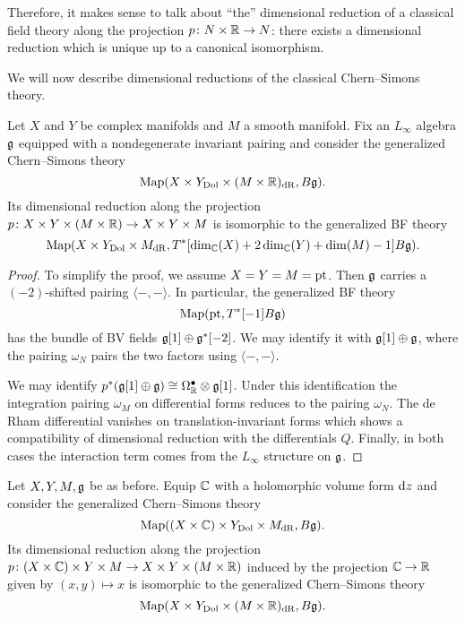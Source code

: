 \documentclass[10pt, oneside]{article}
\begin{document}
\begin{remark}
Therefore, it makes sense to talk about ``the'' dimensional reduction of a classical field theory along the projection $p \colon N \times \mathbb R \to N$: there exists a dimensional reduction which is unique up to a canonical isomorphism.
\end{remark}

We will now describe dimensional reductions of the classical Chern--Simons theory.

\begin{prop} \label{CS_to_BF_diml_red_prop}
Let $X$ and $Y$ be complex manifolds and $M$ a smooth manifold. Fix an $L_\infty$ algebra $\mathfrak g$ equipped with a nondegenerate invariant pairing and consider the generalized Chern--Simons theory
\[\operatorname{Map}(X\times Y_{\mathrm{Dol}}\times (M\times \mathbb R)_{\mathrm{dR}}, B\mathfrak g).\]
Its dimensional reduction along the projection $p\colon X\times Y\times (M\times \mathbb R)\rightarrow X\times Y\times M$ is isomorphic to the generalized BF theory
\[\operatorname{Map}(X\times Y_{\mathrm{Dol}}\times M_{\mathrm{dR}}, T^*[\dim_\mathbb C(X) + 2\dim_\mathbb C(Y) + \dim(M) - 1] B\mathfrak g).\]
\end{prop}

\begin{proof}
To simplify the proof, we assume $X=Y=M=\operatorname{pt}$. Then $\mathfrak g$ carries a $(-2)$-shifted pairing $\langle-,-\rangle$. In particular, the generalized BF theory
\[\operatorname{Map}(\operatorname{pt}, T^*[-1] B \mathfrak g)\]
has the bundle of BV fields $\mathfrak g[1] \oplus \mathfrak g^*[-2]$. We may identify it with $\mathfrak g[1]\oplus \mathfrak g$, where the pairing $\omega_N$ pairs the two factors using $\langle-,-\rangle$.

We may identify $p^*(\mathfrak g[1]\oplus \mathfrak g)\cong \Omega^\bullet_{\mathbb R}\otimes \mathfrak g[1]$. Under this identification the integration pairing $\omega_M$ on differential forms reduces to the pairing $\omega_N$. The de Rham differential vanishes on translation-invariant forms which shows a compatibility of dimensional reduction with the differentials $Q$. Finally, in both cases the interaction term comes from the $L_\infty$ structure on $\mathfrak g$.
\end{proof}

\begin{prop} \label{CS_diml_red_prop}
Let $X,Y,M,\mathfrak g$ be as before. Equip $\mathbb C$ with a holomorphic volume form ${\rm d} z$ and consider the generalized Chern--Simons theory
\[\operatorname{Map}((X\times \mathbb C)\times Y_{\mathrm{Dol}}\times M_{\mathrm{dR}}, B\mathfrak g).\]
Its dimensional reduction along the projection $p\colon (X\times \mathbb C)\times Y\times M\rightarrow X\times Y\times (M\times \mathbb R)$ induced by the projection $\mathbb C\rightarrow \mathbb R$ given by $(x, y)\mapsto x$ is isomorphic to the generalized Chern--Simons theory
\[\operatorname{Map}(X\times Y_{\mathrm{Dol}}\times (M\times \mathbb R)_{\mathrm{dR}}, B\mathfrak g).\]
\end{prop}
\end{document}
